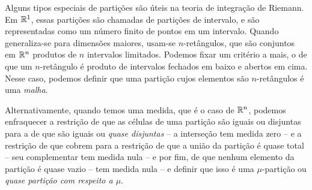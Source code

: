 Alguns tipos especiais de partições são úteis na teoria de integração de Riemann. Em $\mathbb{R}^1$, essas partições são chamadas de partições de intervalo, e são representadas como um número finito de pontos em um intervalo. Quando generaliza-se para dimensões maiores, usam-se $n$-retângulos, que são conjuntos em $\mathbb{R}^n$ produtos de $n$ intervalos limitados. Podemos fixar um critério a mais, o de que um $n$-retângulo é produto de intervalos fechados em baixo e abertos em cima. Nesse caso, podemos definir que uma partição cujos elementos são $n$-retângulos é uma \emph{malha}.

Alternativamente, quando temos uma medida, que é o caso de $\mathbb{R}^n$, podemos enfraquecer a restrição de que as células de uma partição são iguais ou disjuntas para a de que são iguais ou \emph{quase disjuntas} \--- a interseção tem medida zero \--- e a restrição de que cobrem para a restrição de que a união da partição é quase total \--- seu complementar tem medida nula \--- e por fim, de que nenhum elemento da partição é quase vazio \--- tem medida nula \--- e definir que isso é uma $\mu$-partição ou \emph{quase partição com respeito a $\mu$}.